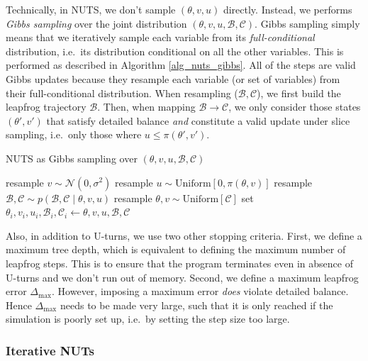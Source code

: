 \documentclass[12pt]{article}
\begin{document}
Technically, in NUTS, we don't sample $(\theta,v,u)$ directly. Instead, we performs \textit{Gibbs sampling} over the joint distribution $(\theta, v, u, \mathcal{B}, \mathcal{C})$. Gibbs sampling simply means that we iteratively sample each variable from its \textit{full-conditional} distribution, i.e.\ its distribution conditional on all the other variables. This is performed as described in Algorithm \ref{alg_nuts_gibbs}. All of the steps are valid Gibbs updates because they resample each variable (or set of variables) from their full-conditional distribution. When resampling ($\mathcal{B}, \mathcal{C}$), we first build the leapfrog trajectory $\mathcal{B}$. Then, when mapping $\mathcal{B} \rightarrow \mathcal{C}$, we only consider those states $(\theta', v')$ that satisfy detailed balance \textit{and} constitute a valid update under slice sampling, i.e.\ only those where $u \leq \pi(\theta', v')$.

\begin{algorithm}
\caption{NUTS as Gibbs sampling over $(\theta, v, u, \mathcal{B}, \mathcal{C})$}
\label{alg_nuts_gibbs}
\begin{algorithmic}
	\State resample $v \sim \mathcal{N}(0, \sigma^2)$
	\State resample $u \sim \text{Uniform} [0, \pi(\theta, v)]$
	\State resample $\mathcal{B}, \mathcal{C} \sim p(\mathcal{B}, \mathcal{C} \mid \theta, v, u)$
	\State resample $\theta, v \sim \text{Uniform}[\mathcal{C}]$
	\State set $\theta_i, v_i, u_i, \mathcal{B}_i, \mathcal{C}_i \gets \theta, v, u, \mathcal{B}, \mathcal{C}$
\EndFor
\end{algorithmic}
\end{algorithm}

Also, in addition to U-turns, we use two other stopping criteria. First, we define a maximum tree depth, which is equivalent to defining the maximum number of leapfrog steps. This is to ensure that the program terminates even in absence of U-turns and we don't run out of memory. Second, we define a maximum leapfrog error $\Delta_\text{max}$. However, imposing a maximum error \textit{does} violate detailed balance. Hence $\Delta_\text{max}$ needs to be made very large, such that it is only reached if the simulation is poorly set up, i.e.\ by setting the step size too large.

\subsubsection{Iterative NUTs}
\end{document}
